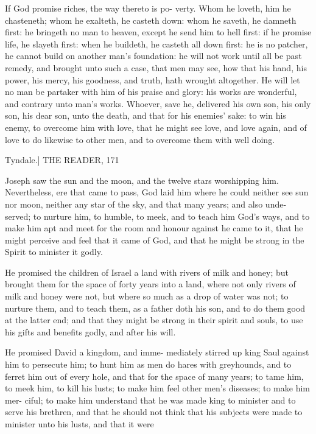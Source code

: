 \documentclass{custom}
\begin{document}
If God promise riches, the way thereto is po- 
verty. Whom he loveth, him he chasteneth;
whom he exalteth, he casteth down: whom he 
saveth, he damneth first: he bringeth no man to 
heaven, except he send him to hell first: if he 
promise life, he slayeth first: when he buildeth,
he casteth all down first: he is no patcher, 
he cannot build on another man's foundation:
he will not work until all be past remedy, and 
brought unto such a case, that men may see, how 
that his hand, his power, his mercy, his goodness, 
and truth, hath wrought altogether. He will let no 
man be partaker with him of his praise and glory:
his works are wonderful, and contrary unto man's 
works. Whoever, save he, delivered his own 
son, his only son, his dear son, unto the death, 
and that for his enemies' sake: to win his enemy, 
to overcome him with love, that he might see 
love, and love again, and of love to do likewise to 
other men, and to overcome them with well doing. 


Tyndale.] 
THE READER, 
171 

Joseph saw the sun and the moon, and the 
twelve stars worshipping him. Nevertheless, 
ere that came to pass, God laid him where he 
could neither see sun nor moon, neither any star 
of the sky, and that many years; and also unde- 
served; to nurture him, to humble, to meek, and
to teach him God's ways, and to make him apt 
and meet for the room and honour against he 
came to it, that he might perceive and feel that 
it came of God, and that he might be strong in 
the Spirit to minister it godly. 

He promised the children of Israel a land 
with rivers of milk and honey; but brought them 
for the space of forty years into a land, where 
not only rivers of milk and honey were not, but 
where so much as a drop of water was not; to 
nurture them, and to teach them, as a father 
doth his son, and to do them good at the latter 
end; and that they might be strong in their 
spirit and souls, to use his gifts and benefits 
godly, and after his will.

He promised David a kingdom, and imme- 
mediately stirred up king Saul against him to 
persecute him; to hunt him as men do hares 
with greyhounds, and to ferret him out of every 
hole, and that for the space of many years; to 
tame him, to meek him, to kill his lusts; to make 
him feel other men's diseases; to make him mer- 
ciful; to make him understand that he was made 
king to minister and to serve his brethren, and 
that he should not think that his subjects were 
made to minister unto his lusts, and that it were 
\end{document}
